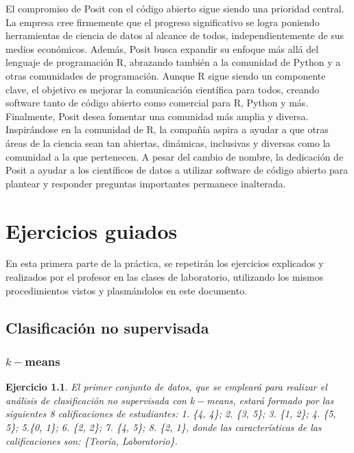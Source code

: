\documentclass[12pt]{report}\usepackage[]{graphicx}\usepackage[dvipsnames]{xcolor}
\newtheorem{exercise}{Ejercicio}[section]
\begin{document}
			El compromiso de Posit con el código abierto sigue siendo una prioridad central. La empresa cree firmemente que el progreso significativo se logra poniendo herramientas de ciencia de datos al alcance de todos, independientemente de sus medios económicos. Además, Posit busca expandir su enfoque más allá del lenguaje de programación R, abrazando también a la comunidad de Python y a otras comunidades de programación. Aunque R sigue siendo un componente clave, el objetivo es mejorar la comunicación científica para todos, creando software tanto de código abierto como comercial para R, Python y más.\\
			
			Finalmente, Posit desea fomentar una comunidad más amplia y diversa. Inspirándose en la comunidad de R, la compañía aspira a ayudar a que otras áreas de la ciencia sean tan abiertas, dinámicas, inclusivas y diversas como la comunidad a la que pertenecen. A pesar del cambio de nombre, la dedicación de Posit a ayudar a los científicos de datos a utilizar software de código abierto para plantear y responder preguntas importantes permanece inalterada.
	
	\chapter{Ejercicios guiados}\pagestyle{fancy}
	
		En esta primera parte de la práctica, se repetirán los ejercicios explicados y realizados por el profesor en las clases de laboratorio, utilizando los mismos procedimientos vistos y plasmándolos en este documento.
		
		\section{Clasificación no supervisada}
		
			\subsection{$k-$means}
		
				\begin{exercise}
					El primer conjunto de datos, que se empleará para realizar el análisis de clasificación no supervisada con $k-$means, estará formado por las siguientes 8 calificaciones de estudiantes: 1. \{4, 4\}; 2. \{3, 5\}; 3. \{1, 2\}; 4. \{5, 5\}; 5.\{0, 1\}; 6. \{2, 2\}; 7. \{4, 5\}; 8. \{2, 1\}, donde las características de las calificaciones son: \{Teoría, Laboratorio\}.
				\end{exercise}
				
\end{document}
